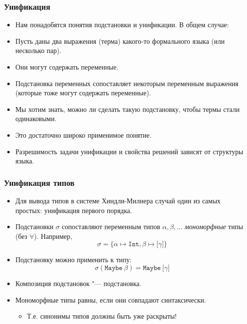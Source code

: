 \documentclass[11pt]{beamer}
\begin{document}
\begin{frame}[fragile]
\frametitle{Унификация}
\begin{itemize}
    \item Нам понадобятся понятия подстановки и унификации. В общем случае:
    \pause 
    \item Пусть даны два выражения (терма) какого-то формального языка (или несколько пар). 
    \item Они могут содержать переменные.
    \pause
    \item Подстановка переменных сопоставляет некоторым переменным выражения (которые тоже могут содержать переменные).
    \pause
    \item Мы хотим знать, можно ли сделать такую подстановку, чтобы термы стали одинаковыми.
    \pause
    \item Это достаточно широко применимое понятие.
    \pause
    \item Разрешимость задачи унификации и свойства решений зависят от структуры языка. 
\end{itemize}
\end{frame}

\begin{frame}[fragile]
\frametitle{Унификация типов}
\begin{itemize}
    \item Для вывода типов в системе Хиндли-Милнера случай один из самых простых: унификация первого порядка.
    \item Подстановки $\sigma$ сопоставляют переменным типов $\alpha, \beta, \ldots$ \emph{мономорфные} типы (без $\forall$). Например,
    \[ \sigma=\{\alpha \mapsto \mathtt{Int}, \beta \mapsto \mathtt{[}\gamma\mathtt{]} \} \]
    \item Подстановку можно применить к типу:
    \[ \sigma(\mathtt{Maybe}~\beta)=\mathtt{Maybe}~\mathtt{[}\gamma\mathtt{]} \]
    \item Композиция подстановок "--- подстановка.
    \item Мономорфные типы равны, если они совпадают синтаксически. 
    \pause
    \begin{itemize}
        \item Т.е. синонимы типов должны быть уже раскрыты!
    \end{itemize}
\end{itemize}
\end{frame}
\end{document}
